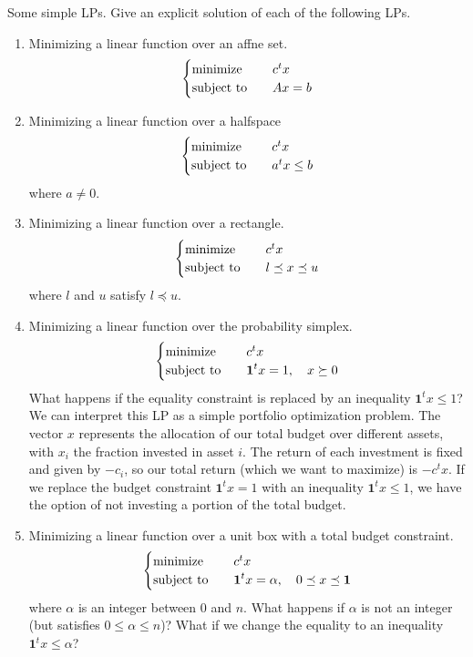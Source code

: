 \begin{problem}[4.8]
    Some simple LPs. Give an explicit solution of each of the following LPs.
    \begin{enumerate}
        \item Minimizing a linear function over an affne set.\[\begin{cases}
            \operatorname{minimize} \quad & c^tx \\
            \operatorname{subject\ to} \quad &Ax = b
        \end{cases}\]
        \item Minimizing a linear function over a halfspace \[\begin{cases}
            \operatorname{minimize} \quad & c^tx \\
            \operatorname{subject\ to} \quad &a^tx \le b
        \end{cases}\] where $a \neq 0$.
        \item Minimizing a linear function over a rectangle.\[\begin{cases}
            \operatorname{minimize} \quad & c^tx \\
            \operatorname{subject\ to} \quad & l \preceq x \preceq u
        \end{cases}\] where $l$ and $u$ satisfy $l \preceq u$.
        \item Minimizing a linear function over the probability simplex.\[\begin{cases}
            \operatorname{minimize} \quad & c^tx \\
            \operatorname{subject\ to} \quad & \textbf{1}^tx = 1, \quad x \succeq 0
        \end{cases}\]
        What happens if the equality constraint is replaced by an inequality $\textbf{1}^tx \le 1$? We can interpret this LP as a simple portfolio optimization problem. The vector $x$ represents the allocation of our total budget over different assets, with $x_i$ the fraction invested in asset $i$. The return of each investment is fixed and given by $-c_i$, so our total return (which we want to maximize) is $-c^tx$. If we replace the budget constraint $\textbf{1}^tx = 1$ with an inequality $\textbf{1}^tx \le 1$, we have the option of not investing a portion of the total budget.
        \item Minimizing a linear function over a unit box with a total budget constraint.\[\begin{cases}
            \operatorname{minimize} \quad & c^tx \\
            \operatorname{subject\ to} \quad &\textbf{1}^tx = \alpha, \quad 0 \preceq x \preceq \textbf{1}
        \end{cases}\] where $\alpha$ is an integer between 0 and $n$. What happens if $\alpha$ is not an integer (but satisfies $0 \le \alpha \le n$)? What if we change the equality to an inequality $\textbf{1}^tx \le \alpha$?

\end{enumerate}
\end{problem}
